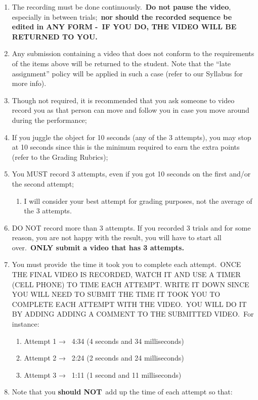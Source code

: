 \documentclass[
  letterpaper,
  DIV=11,
  numbers=noendperiod]{scrartcl}
\providecommand{\tightlist}{%
  \setlength{\itemsep}{0pt}\setlength{\parskip}{0pt}}\usepackage{longtable,booktabs,array}
\begin{document}
\begin{enumerate}
\def\labelenumi{\arabic{enumi}.}
\tightlist
\item
  The recording must be done continuously.~\textbf{Do not pause the
  video}, especially in between trials;~\textbf{nor should the recorded
  sequence be edited in ANY FORM -~IF YOU DO, THE VIDEO WILL BE RETURNED
  TO YOU.}
\item
  Any submission containing a video that does not conform to the
  requirements of the items above will be returned to the student. Note
  that the ``late assignment'' policy will be applied in such a case
  (refer to our Syllabus for more info).~
\item
  Though not required, it is recommended that you ask someone to video
  record you as that person can move and follow you in case you move
  around during the performance;
\item
  If you juggle the object for 10 seconds (any of the 3 attempts), you
  may stop at 10 seconds since this is the minimum required to earn the
  extra points (refer to the Grading Rubrics);
\item
  You MUST record 3 attempts, even if you got 10 seconds on the first
  and/or the second attempt;

  \begin{enumerate}
  \def\labelenumii{\arabic{enumii}.}
  \tightlist
  \item
    I will consider your best attempt for grading purposes, not the
    average of the 3 attempts.
  \end{enumerate}
\item
  DO NOT record more than 3 attempts. If you recorded 3 trials and for
  some reason, you are not happy with the result, you will have to start
  all over.~\textbf{ONLY submit a video that has 3 attempts.}
\item
  You must provide~the time it took you to complete each attempt.~ONCE
  THE FINAL VIDEO IS RECORDED, WATCH IT AND USE A TIMER (CELL PHONE) TO
  TIME EACH ATTEMPT. WRITE IT DOWN SINCE YOU WILL NEED TO SUBMIT THE
  TIME IT TOOK YOU TO COMPLETE EACH ATTEMPT WITH THE VIDEO.~YOU WILL DO
  IT BY ADDING ADDING A COMMENT TO THE SUBMITTED VIDEO.~For instance:

  \begin{enumerate}
  \def\labelenumii{\arabic{enumii}.}
  \tightlist
  \item
    Attempt 1 →~ 4:34 (4 seconds and 34 milliseconds)
  \item
    Attempt 2 →~ 2:24 (2 seconds and 24 milliseconds)
  \item
    Attempt 3 →~ 1:11 (1 second and 11 milliseconds)
  \end{enumerate}
\item
  Note that you \textbf{should NOT}~add up the time of each attempt so
  that:


\end{enumerate}
\end{document}
